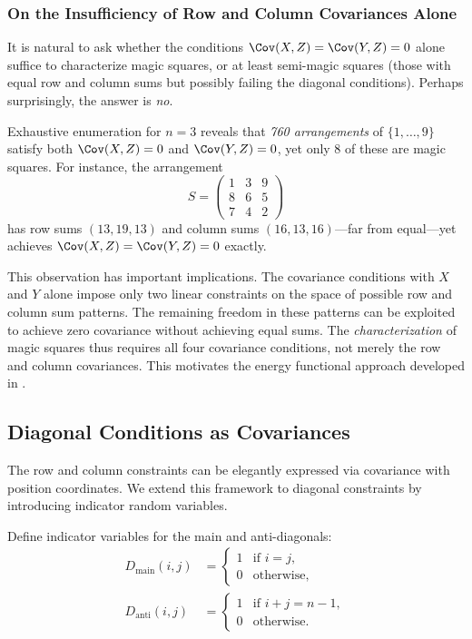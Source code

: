 \subsubsection{On the Insufficiency of Row and Column Covariances Alone}
\label{sec:insufficiency}

It is natural to ask whether the conditions $\Cov(X, Z) = \Cov(Y, Z) = 0$ alone 
suffice to characterize magic squares, or at least semi-magic squares 
(those with equal row and column sums but possibly failing the diagonal conditions).
Perhaps surprisingly, the answer is \emph{no}.

\begin{remark}
\label{rem:counterexample}
Exhaustive enumeration for $n = 3$ reveals that \emph{760 arrangements} of $\{1, \ldots, 9\}$ 
satisfy both $\Cov(X, Z) = 0$ and $\Cov(Y, Z) = 0$, yet only 8 of these are magic squares.
For instance, the arrangement
\[
S = \begin{pmatrix}
1 & 3 & 9 \\
8 & 6 & 5 \\
7 & 4 & 2
\end{pmatrix}
\]
has row sums $(13, 19, 13)$ and column sums $(16, 13, 16)$---far from equal---yet 
achieves $\Cov(X, Z) = \Cov(Y, Z) = 0$ exactly.
\end{remark}

This observation has important implications.
The covariance conditions with $X$ and $Y$ alone impose only two linear constraints 
on the space of possible row and column sum patterns.
The remaining freedom in these patterns can be exploited to achieve zero covariance 
without achieving equal sums.
The \emph{characterization} of magic squares thus requires all four covariance conditions, 
not merely the row and column covariances.
This motivates the energy functional approach developed in .

\subsection{Diagonal Conditions as Covariances}
\label{sec:diagonal_cov}

The row and column constraints can be elegantly expressed via covariance with position coordinates.
We extend this framework to diagonal constraints by introducing indicator random variables.

\begin{definition}
Define indicator variables for the main and anti-diagonals:
\begin{align}
D_{\mathrm{main}}(i,j) &= \begin{cases} 1 & \text{if } i = j, \\ 0 & \text{otherwise}, \end{cases} \\
D_{\mathrm{anti}}(i,j) &= \begin{cases} 1 & \text{if } i + j = n - 1, \\ 0 & \text{otherwise}. \end{cases}
\end{align}
\end{definition}

